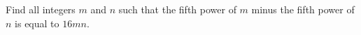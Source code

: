 Find all integers $m$ and $n$ such that the fifth power of $m$ minus the fifth power of $n$ is equal to $16mn$.